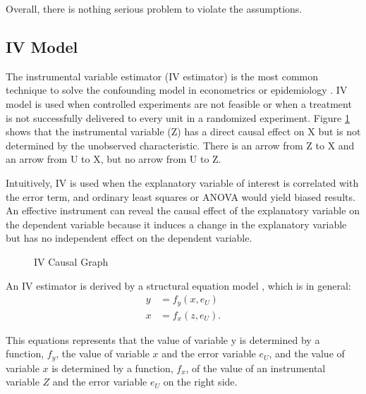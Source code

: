 \documentclass{article}\usepackage[]{graphicx}\usepackage[]{xcolor}
\begin{document}
Overall, there is nothing serious problem to violate the assumptions.

\newpage
\subsection*{IV Model}
The instrumental variable estimator (IV estimator) is the most common technique to solve the confounding model in econometrics or epidemiology \citep{klungel2015instrumental}.
IV model is used when controlled experiments are not feasible or when a treatment is not successfully delivered to every unit in a randomized experiment.
Figure \ref{fig:iv} shows that the instrumental variable (Z) has a direct causal effect on X 
but is not determined by the unobserved characteristic. 
There is an arrow from Z to X and an arrow from U to X, but no arrow from U to Z.

Intuitively, IV is used when the explanatory variable of interest is correlated with the error term, and ordinary least squares or ANOVA would yield biased results.
An effective instrument can reveal the causal effect of the explanatory variable on the dependent variable because it induces a change in the explanatory variable but has no independent effect on the dependent variable.


\begin{figure}[htp]
\centering
{}
\caption{IV Causal Graph}
\label{fig:iv}
\end{figure}

An IV estimator is derived by a structural equation model \citep{bielby1977structural}, which is in general:
\begin{align*}
y&=f_y(x,e_U)\\
x&=f_x(z,e_U).
\end{align*}

This equations represents that 
the value of variable y is determined by a function, $f_y$, 
the value of variable $x$ and the error variable $e_U$, and 
the value of variable $x$ is determined by 
a function, $f_x$, of the value of an instrumental variable $Z$ and 
the error variable $e_U$ on the right side.
\end{document}
